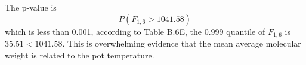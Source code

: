 \documentclass{article}\usepackage[]{graphicx}\usepackage[]{color}
\begin{document}
\begin{enumerate}
\begin{itemize}
\begin{center}
\begin{tabular}{lllll}
  \end{tabular}
  \end{center}
  The p-value is
  \[P(F_{1, 6} > 1041.58)\]
  which is less than 0.001, according to Table B.6E, the 0.999 quantile of $F_{1,6}$ is $35.51 < 1041.58$. This is overwhelming evidence that the mean average molecular weight is related to the pot temperature.
  
	\end{itemize}
	
\end{enumerate}
% 
%
\end{document}
